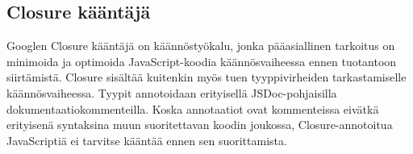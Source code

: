\subsection{Closure kääntäjä}
Googlen Closure kääntäjä on käännöstyökalu, jonka pääasiallinen tarkoitus
on minimoida ja optimoida JavaScript-koodia käännösvaiheessa ennen tuotantoon
siirtämistä. Closure sisältää kuitenkin myös tuen tyyppivirheiden
tarkastamiselle käännösvaiheessa\cite{ClosureCompiler}. Tyypit annotoidaan
erityisellä JSDoc-pohjaisilla dokumentaatiokommenteilla. Koska annotaatiot
ovat kommenteissa eivätkä erityisenä syntaksina muun suoritettavan koodin
joukossa, Closure-annotoitua JavaScriptiä ei tarvitse kääntää ennen sen
suorittamista\cite{annotatingJSforClosure}.